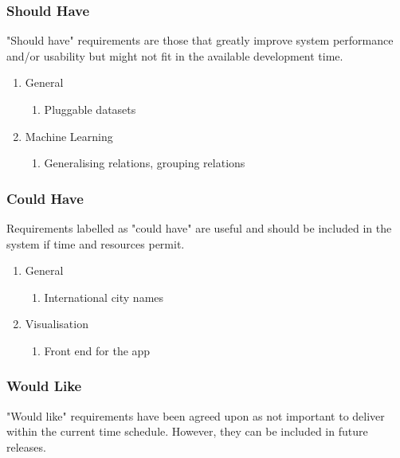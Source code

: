 \subsubsection {Should Have}
"Should have" requirements are those that greatly improve system performance and/or usability but might not fit in the available development time.

\begin{enumerate}
    \item{General}
    \begin{enumerate}
        \item Pluggable datasets
    \end{enumerate}
    
    \item{Machine Learning}  
    \begin{enumerate}
        \item Generalising relations, grouping relations
    \end{enumerate}
\end{enumerate}


\subsubsection {Could Have}
Requirements labelled as "could have" are useful and should be included in the system if time and resources permit.

\begin{enumerate}
    \item{General}
    \begin{enumerate}
        \item International city names
    \end{enumerate}
    
    \item{Visualisation}    
    \begin{enumerate}
        \item Front end for the app
    \end{enumerate}
\end{enumerate}

\subsubsection {Would Like}
"Would like" requirements have been agreed upon as not important to deliver within the current time schedule. However, they can be included in future releases.